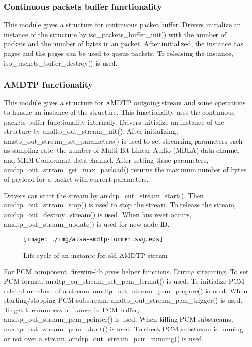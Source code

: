 \documentclass[onecolumn]{article}
\begin{document}
\subsubsection{Continuous packets buffer functionality}

This module gives a structure for continuous packet buffer. Drivers initialize an instance of the structure by iso\_packets\_buffer\_init() with the number of packets and the number of bytes in an packet. After initialized, the instance has pages and the pages can be used to queue packets. To releasing the instance, iso\_packets\_buffer\_destroy() is used.

\subsubsection{AMDTP functionality}
\label{sec:enhancement-amdtp}

This module gives a structure for AMDTP outgoing stream and some operations to handle an instance of the structure. This functionality uses the continuous packets buffer functionality internally. Drivers initialize an instance of the structure by amdtp\_out\_stream\_init(). After initializing, amstp\_out\_stream\_set\_parameters() is used to set streaming parameters such as sampling rate, the number of Multi Bit Linear Audio (MBLA) data channel and MIDI Conformant data channel. After setting these parameters, amdtp\_out\_stream\_get\_max\_payload() returns the maximum number of bytes of payload for a packet with current parameters.

Drivers can start the stream by amdtp\_out\_stream\_start(). Then amdtp\_out\_stream\_stop() is used to stop the stream. To release the stream, amdtp\_out\_destroy\_stream() is used. When bus reset occurs, amdtp\_out\_stream\_update() is used for new node ID.

\begin{figure}[H]
	\centering
	\texttt{[image: ./img/alsa-amdtp-former.svg.eps]}
	\caption{{Life cycle of an instance for old AMDTP stream}}
	\label{{lifecycle-old-amdtp-stream}}
\end{figure}

For PCM component, firewire-lib gives helper functions. During streaming, To set PCM format, amdtp\_ou\_stream\_set\_pcm\_format() is used. To initialize PCM-related members of a stream, amdtp\_out\_stream\_pcm\_prepare() is used. When starting/stopping PCM substream, amdtp\_out\_stream\_pcm\_trigger() is used. To get the numbers of frames in PCM buffer, amdtp\_out\_stream\_pcm\_pointer() is used. When killing PCM substreams, amdtp\_out\_stream\_pcm\_abort() is used. To check PCM substream is running or not over a stream, amdtp\_out\_stream\_pcm\_running() is used.
\end{document}
